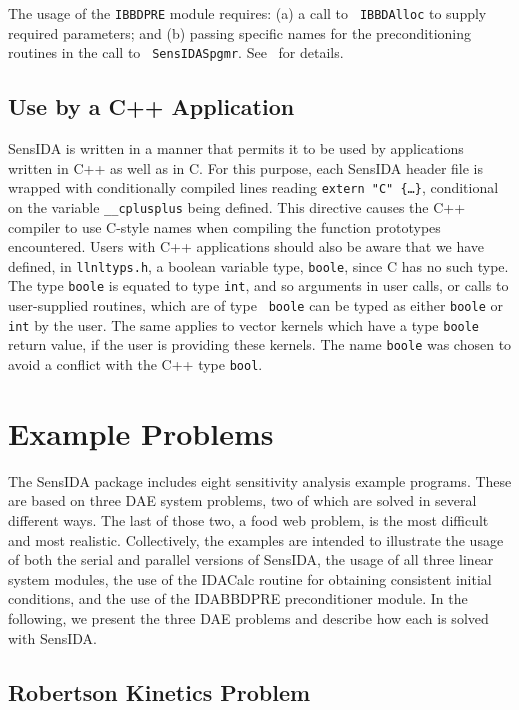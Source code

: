 The usage of the {\tt IBBDPRE} module requires: (a) a call to {\tt
IBBDAlloc} to supply required parameters; and (b) passing specific
names for the preconditioning routines in the call to {\tt
SensIDASpgmr}.
See~\cite{IDA_UG} for details.

\subsection{Use by a C++ Application}

SensIDA is written in a manner that permits it to be used by
applications written in C++ as well as in C.  
For this purpose, each SensIDA header file is wrapped with
conditionally compiled lines reading {\tt extern "C" \{\ldots\}},
conditional on the variable {\tt \_\_cplusplus} being defined.
This directive causes the C++ compiler to use C-style names when
compiling the function prototypes encountered.
Users with C++ applications should also be aware that we have defined,
in {\tt llnltyps.h}, a boolean variable type, {\tt boole}, since C has
no such type.
The type {\tt boole} is equated to type {\tt int}, and so arguments in
user calls, or calls to user-supplied routines, which are of type {\tt
boole} can be typed as either {\tt boole} or {\tt int} by the user.
The same applies to vector kernels which have a type {\tt boole}
return value, if the user is providing these kernels.
The name {\tt boole} was chosen to avoid a conflict with the C++ type
{\tt bool}.

\section{Example Problems}

The SensIDA package includes eight sensitivity analysis example programs. 
These are based on three DAE system problems, two of which are solved in
several different ways.
The last of those two, a food web problem, is the most difficult and
most realistic.
Collectively, the examples are intended to illustrate the usage of
both the serial and parallel versions of SensIDA, the usage of all
three linear system modules, the use of the IDACalc routine for
obtaining consistent initial conditions, and the use of the IDABBDPRE
preconditioner module. In the following, we present the three DAE
problems and describe how each is solved with SensIDA.

\subsection{Robertson Kinetics Problem}

